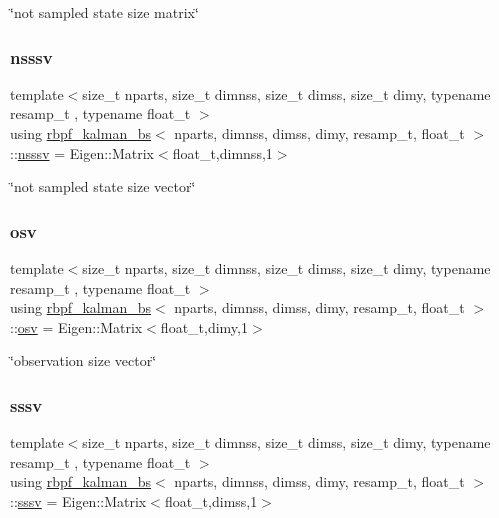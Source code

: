 \char`\"{}not sampled state size matrix\char`\"{} \mbox{\label{classrbpf__kalman__bs_a896c6ca25182e5569df4bfa6c40f9a54}} 
\subsubsection{\texorpdfstring{nsssv}{nsssv}}
{\footnotesize\ttfamily template$<$size\+\_\+t nparts, size\+\_\+t dimnss, size\+\_\+t dimss, size\+\_\+t dimy, typename resamp\+\_\+t , typename float\+\_\+t $>$ \\
using \hyperlink{classrbpf__kalman__bs}{rbpf\+\_\+kalman\+\_\+bs}$<$ nparts, dimnss, dimss, dimy, resamp\+\_\+t, float\+\_\+t $>$\+::\hyperlink{classrbpf__kalman__bs_a896c6ca25182e5569df4bfa6c40f9a54}{nsssv} =  Eigen\+::\+Matrix$<$float\+\_\+t,dimnss,1$>$}

\char`\"{}not sampled state size vector\char`\"{} \mbox{\label{classrbpf__kalman__bs_a51f159fe3b1d23742ba06d82d4724186}} 
\subsubsection{\texorpdfstring{osv}{osv}}
{\footnotesize\ttfamily template$<$size\+\_\+t nparts, size\+\_\+t dimnss, size\+\_\+t dimss, size\+\_\+t dimy, typename resamp\+\_\+t , typename float\+\_\+t $>$ \\
using \hyperlink{classrbpf__kalman__bs}{rbpf\+\_\+kalman\+\_\+bs}$<$ nparts, dimnss, dimss, dimy, resamp\+\_\+t, float\+\_\+t $>$\+::\hyperlink{classrbpf__kalman__bs_a51f159fe3b1d23742ba06d82d4724186}{osv} =  Eigen\+::\+Matrix$<$float\+\_\+t,dimy,1$>$}

\char`\"{}observation size vector\char`\"{} \mbox{\label{classrbpf__kalman__bs_a2b40c9fa0d7a2ca42be3d0c43db0db8b}} 
\subsubsection{\texorpdfstring{sssv}{sssv}}
{\footnotesize\ttfamily template$<$size\+\_\+t nparts, size\+\_\+t dimnss, size\+\_\+t dimss, size\+\_\+t dimy, typename resamp\+\_\+t , typename float\+\_\+t $>$ \\
using \hyperlink{classrbpf__kalman__bs}{rbpf\+\_\+kalman\+\_\+bs}$<$ nparts, dimnss, dimss, dimy, resamp\+\_\+t, float\+\_\+t $>$\+::\hyperlink{classrbpf__kalman__bs_a2b40c9fa0d7a2ca42be3d0c43db0db8b}{sssv} =  Eigen\+::\+Matrix$<$float\+\_\+t,dimss,1$>$}

